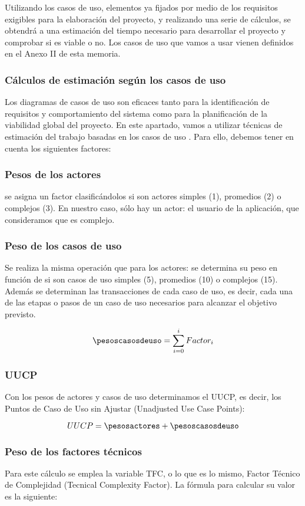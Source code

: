Utilizando los casos de uso, elementos ya fijados por medio de los requisitos exigibles para la elaboración del proyecto, y realizando una serie de cálculos, se obtendrá a una estimación del tiempo necesario para desarrollar el proyecto y comprobar si es viable o no. Los casos de uso que vamos a usar vienen definidos en el Anexo II de esta memoria.


\subsubsection{Cálculos de estimación según los casos de uso}
Los diagramas de casos de uso son eficaces tanto para la identificación de requisitos y comportamiento del sistema como para la planificación de la viabilidad global del proyecto. En este apartado, vamos a utilizar técnicas de estimación del trabajo basadas en los casos de uso \cite{wiki:casosuso}. Para ello, debemos tener en cuenta los siguientes factores:

\subsubsection*{Pesos de los actores}
se asigna un factor clasificándolos si son actores simples (1), promedios (2) o complejos (3). En nuestro caso, sólo hay un actor: el usuario de la aplicación, que consideramos que es complejo.

\subsubsection*{Peso de los casos de uso}
Se realiza la misma operación que para los actores: se determina su peso en función de si son casos de uso simples (5), promedios (10) o complejos (15). Además se determinan las transacciones de cada caso de uso, es decir, cada una de las etapas o pasos de un caso de uso necesarios para alcanzar el objetivo previsto.

\[ \pesoscasosdeuso = \sum_{i = 0}^{i} Factor_{i} \]

\subsubsection*{UUCP}
Con los pesos de actores y casos de uso determinamos el UUCP, es decir, los Puntos de Caso de Uso sin Ajustar (Unadjusted Use Case Points):

\[ UUCP = \pesosactores + \pesoscasosdeuso \]

\subsubsection*{Peso de los factores técnicos}
Para este cálculo se emplea la variable TFC, o lo que es lo mismo, Factor Técnico de Complejidad (Tecnical Complexity Factor). La fórmula para calcular su valor es la siguiente:

